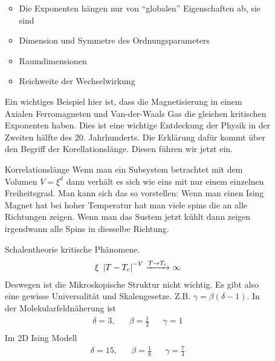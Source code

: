 \begin{description}
\begin{enumerate}[Beispiel I)]
      \begin{itemize}
        \item Die Exponenten hängen nur von ``globalen'' Eigenschaften ab, sie sind
        \item Dimension und Symmetre des Ordnungsparameters
        \item Raumdimensionen
        \item Reichweite der Wechselwirkung
      \end{itemize}
      Ein wichtiges Beispiel hier ist, dass die Magnetisierung in einem
      Axialen Ferromagneten und Van-der-Waals Gas die gleichen kritischen
      Exponenten haben. Dies ist eine wichtige Entdeckung der Physik in
      der Zweiten hälfte des 20. Jahrhunderts. Die Erklärung dafür kommt
      über den Begriff der Korellationslänge. Diesen führen wir jetzt ein.
    \item[Korrelationslänge] Wenn man ein Subsystem betrachtet mit dem Volumen
      $V = \xi^d$ dann verhält es sich wie eins mit nur einem einzelnen Freiheitsgrad.
      Man kann sich das so vorstellen: Wenn man einen Ising Magnet hat bei hoher
      Temperatur hat man viele spins die an alle Richtungen zeigen. Wenn man
      das Sustem jetzt kühlt dann zeigen irgendwann alle Spins in diesselbe Richtung.
    \item[Schalentheorie] kritische Phänomene.
      \begin{align*}
        \xi ~  \left|  T - T_c \right|^{-V} \xrightarrow{T\to T_c} \infty
      \end{align*}
      Deswegen ist die Mikroskopische Struktur nicht wichtig. Es gibt also
      eine gewisse Universalität und Skalengesetze. Z.B. $\gamma = \beta(\delta - 1)$.
      In der Molekularfeldnäherung ist
      \begin{align*}
        \delta = 3, && \beta = \frac{1}{2} && \gamma = 1 \\
      \end{align*}
      Im 2D Ising Modell
      \begin{align*}
        \delta = 15, && \beta = \frac{1}{8} && \gamma = \frac{7}{4}
      \end{align*}


    \end{enumerate}

\end{description}

